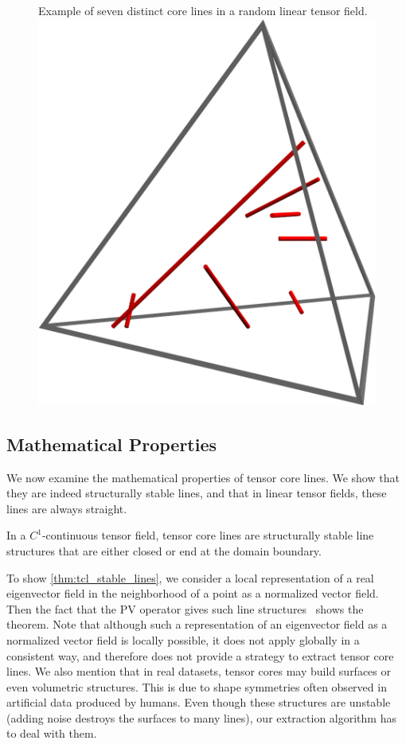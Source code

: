 \begin{figure}
    \begin{captionbeside}
        {Example of seven distinct core lines in a random linear tensor field.
        \label{fig:7lines}}
        \includegraphics[width=0.5\columnwidth]{figures/7lines}
    \end{captionbeside}
\end{figure}
%

\subsection{Mathematical Properties} %
\label{sub:mathematical_properties}
%
We now examine the mathematical properties of tensor core lines.
%
We show that they are indeed structurally stable lines, and that in linear
tensor fields, these lines are always straight.
%

%
\begin{theorem}\label{thm:tcl_stable_lines}
In a $C^1$-continuous tensor field, tensor core lines are structurally stable
line structures that are either closed or end at the domain boundary.
\end{theorem}
%
To show \cref{thm:tcl_stable_lines}, we consider a local representation of a
real eigenvector field in the neighborhood of a point as a normalized vector
field.
%
Then the fact that the \ac{PV} operator gives such line
structures~\cite{Peikert1999} shows the theorem.
%
Note that although such a representation of an eigenvector field as a normalized
vector field is locally possible, it does not apply globally in a consistent
way, and therefore does not provide a strategy to extract tensor core lines.
%
We also mention that in real datasets, tensor cores may build surfaces or even
volumetric structures.
%
This is due to shape symmetries often observed in artificial data produced by
humans.
%
Even though these structures are unstable (adding noise destroys the surfaces to
many lines), our extraction algorithm has to deal with them.
%

